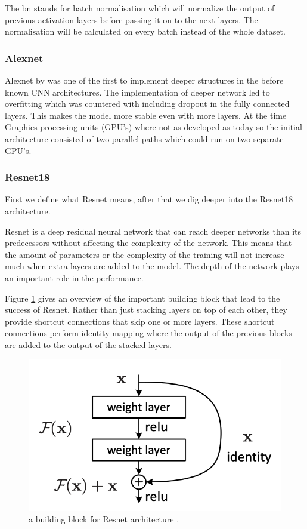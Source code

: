 		The bn stands for batch normalisation which will normalize the output of previous activation layers before passing it on to the next layers. The normalisation will be calculated on every batch instead of the whole dataset.
		
		\subsubsection{Alexnet}
		Alexnet by \cite{Krizhevsky2017} was one of the first to implement deeper structures in the before known CNN architectures. The implementation of deeper network led to overfitting which was countered with including dropout in the fully connected layers. This makes the model more stable even with more layers. At the time Graphics processing units (GPU's) where not as developed as today so the initial architecture consisted of two parallel paths which could run on two separate GPU's. 
		
			\subsubsection{Resnet18}
			First we define what Resnet \citep{He2016} means, after that we dig deeper into the Resnet18 architecture.
			
			Resnet is a deep residual neural network that can reach deeper networks than its predecessors without affecting the complexity of the network. This means that the amount of parameters or the complexity of the training will not increase much when extra layers are added to the model. 
			The depth of the network plays an important role in the performance. 
			
			Figure \ref{fig:vis:resnetBlock} gives an overview of the important building block that lead to the success of Resnet.  Rather than just stacking layers on top of each other, they provide shortcut connections that skip one or more layers. These shortcut connections perform identity mapping where the output of the previous blocks are added to the output of the stacked layers. 
			
			\begin{figure}[hbtp]
			\centering
			\includegraphics[scale=0.8]{fig/Research/Vision_Algorithm/algorithms/Resnet/resnet_block.png}
			\caption{a building block for Resnet architecture \citep{He2016}.}
			\label{fig:vis:resnetBlock}
			\end{figure}
			
